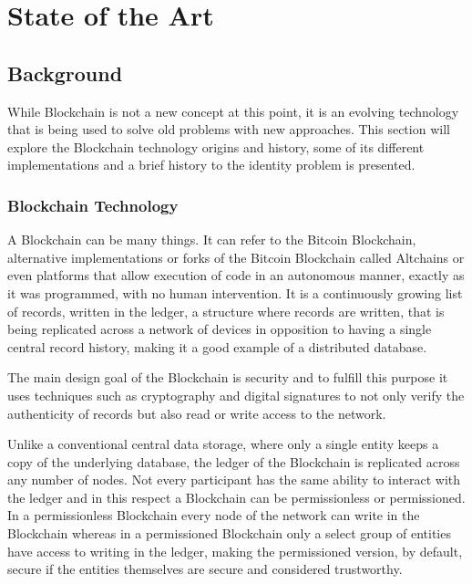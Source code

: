 \chapter{State of the Art}
\section{Background} \label{background}

While Blockchain is not a new concept at this point, it is an evolving
technology that is being used to solve old problems with new approaches. This
section will explore the Blockchain technology origins and history, some of its
different implementations and a brief history to the identity problem is
presented.

\subsection{Blockchain Technology}

A Blockchain can be many things. It can refer to the Bitcoin Blockchain,
alternative implementations or forks of the Bitcoin Blockchain called Altchains
or even platforms that allow execution of code in an autonomous manner, exactly
as it was programmed, with no human intervention.  It is a continuously growing
list of records, written in the ledger, a structure where records are written,
that is being replicated across a network of devices in opposition to having a
single central record history, making it a good example of a distributed
database.  \cite{Wood2017}

The main design goal of the Blockchain is security and to fulfill this purpose
it uses techniques such as cryptography and digital signatures to not only
verify the authenticity of records but also read or write access to the
network.

Unlike a conventional central data storage, where only a single entity keeps a
copy of the underlying database, the ledger of the Blockchain is replicated
across any number of nodes.  Not every participant has the same ability to
interact with the ledger and in this respect a Blockchain can be permissionless
or permissioned. In a permissionless Blockchain every node of the network can
write in the Blockchain whereas in a permissioned Blockchain only a select
group of entities have access to writing in the ledger, making the permissioned
version, by default, secure if the entities themselves are secure and
considered trustworthy.


